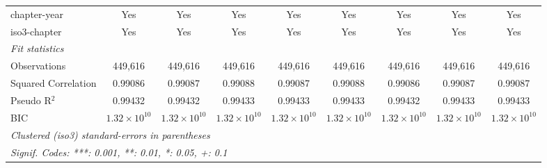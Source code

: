 \begin{tabular}{lcccccccc}
   chapter-year                                                       & Yes                   & Yes                   & Yes                   & Yes                   & Yes                   & Yes                   & Yes                   & Yes\\  
   iso3-chapter                                                       & Yes                   & Yes                   & Yes                   & Yes                   & Yes                   & Yes                   & Yes                   & Yes\\  
   \midrule
   \emph{Fit statistics}\\
   Observations                                                       & 449,616               & 449,616               & 449,616               & 449,616               & 449,616               & 449,616               & 449,616               & 449,616\\  
   Squared Correlation                                                & 0.99086               & 0.99087               & 0.99088               & 0.99087               & 0.99088               & 0.99086               & 0.99087               & 0.99087\\  
   Pseudo R$^2$                                                       & 0.99432               & 0.99432               & 0.99433               & 0.99433               & 0.99433               & 0.99432               & 0.99433               & 0.99433\\  
   BIC                                                                & $1.32\times 10^{10}$  & $1.32\times 10^{10}$  & $1.32\times 10^{10}$  & $1.32\times 10^{10}$  & $1.32\times 10^{10}$  & $1.32\times 10^{10}$  & $1.32\times 10^{10}$  & $1.32\times 10^{10}$\\   
   \midrule \midrule
   \multicolumn{9}{l}{\emph{Clustered (iso3) standard-errors in parentheses}}\\
   \multicolumn{9}{l}{\emph{Signif. Codes: ***: 0.001, **: 0.01, *: 0.05, +: 0.1}}\\
\end{tabular}
\par\endgroup


